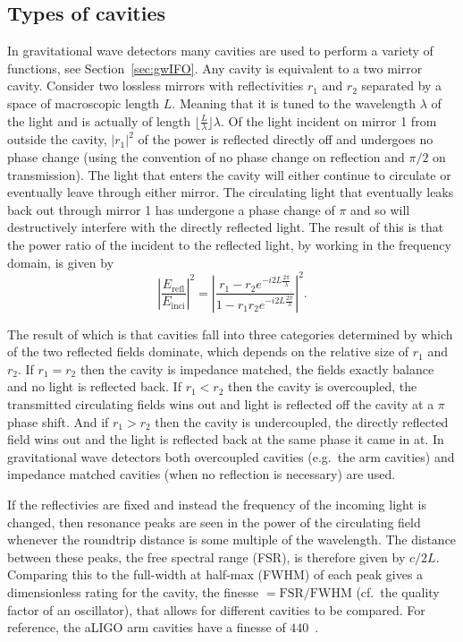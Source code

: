 \documentclass[aps,pra,superscriptaddress,reprint,nofootinbib]{revtex4-1}
\newcommand{\abs}[1]{\left\lvert #1 \right\rvert}
\begin{document}
\subsection{Types of cavities}

In gravitational wave detectors many cavities are used to perform a variety of functions, see Section~\ref{sec:gwIFO}. Any cavity is equivalent to a two mirror cavity. Consider two lossless mirrors with reflectivities $r_1$ and $r_2$ separated by a space of macroscopic length $L$. Meaning that it is tuned to the wavelength $\lambda$ of the light and is actually of length $\lfloor \frac{L}{\lambda} \rfloor \lambda$. Of the light incident on mirror 1 from outside the cavity, $\abs{r_1}^2$ of the power is reflected directly off and undergoes no phase change (using the convention of no phase change on reflection and $\pi/2$ on transmission). The light that enters the cavity will either continue to circulate or eventually leave through either mirror. The circulating light that eventually leaks back out through mirror 1 has undergone a phase change of $\pi$ and so will destructively interfere with the directly reflected light. The result of this is that the power ratio of the incident to the reflected light, by working in the frequency domain, is given by~\cite{Danilishin_2012}
$$\abs{\frac{E_{\mathrm{refl}}}{E_{\mathrm{inci}}}}^2 = \abs{\frac{r_1 - r_2 e^{-i 2 L \frac{2\pi}{\lambda}}}{1- r_1 r_2 e^{-i 2 L \frac{2\pi}{\lambda}}}}^2.$$ 

The result of which is that cavities fall into three categories determined by which of the two reflected fields dominate, which depends on the relative size of $r_1$ and $r_2$. If $r_1 = r_2$ then the cavity is impedance matched, the fields exactly balance and no light is reflected back. If $r_1 < r_2$ then the cavity is overcoupled, the transmitted circulating fields wins out and light is reflected off the cavity at a $\pi$ phase shift. And if $r_1 > r_2$ then the cavity is undercoupled, the directly reflected field wins out and the light is reflected back at the same phase it came in at. In gravitational wave detectors both overcoupled cavities (e.g.\ the arm cavities) and impedance matched cavities (when no reflection is necessary) are used.


If the reflectivies are fixed and instead the frequency of the incoming light is changed, then resonance peaks are seen in the power of the circulating field whenever the roundtrip distance is some multiple of the wavelength. The distance between these peaks, the free spectral range (FSR), is therefore given by $c/{2L}$. Comparing this to the full-width at half-max (FWHM) of each peak gives a dimensionless rating for the cavity, the finesse $= \mathrm{FSR}/\mathrm{FWHM}$ (cf.\ the quality factor of an oscillator), that allows for different cavities to be compared. For reference, the aLIGO arm cavities have a finesse of $440$~\cite{AdvancedLIGO:2015}.
\end{document}
